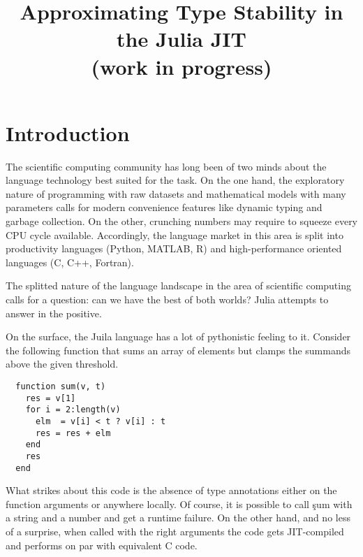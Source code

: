 \documentclass[sigplan,review,anonymous]{acmart}
\begin{document}
\title[Approximating Type Stability in the Julia JIT (work in progress)]{Approximating Type Stability in the Julia JIT\\(work in progress)}


\maketitle

\section{Introduction}

The scientific computing community has long been of two minds about the language
technology best suited for the task. On the one hand, the exploratory nature of
programming with raw datasets and mathematical models with many parameters calls
for modern convenience features like dynamic typing and garbage collection. On
the other, crunching numbers may require to squeeze every CPU cycle available.
Accordingly, the language market in this area is split into productivity
languages (Python, MATLAB, R) and high-performance oriented languages (C,
C++, Fortran).

The splitted nature of the language landscape in the area of scientific
computing calls for a question: can we have the best of both worlds? Julia
attempts to answer in the positive.

On the surface, the Juila language has a lot of pythonistic feeling to it.
Consider the following function that sums an array of elements but clamps the
summands above the given threshold.
%
\begin{verbatim}
  function sum(v, t)
    res = v[1]
    for i = 2:length(v)
      elm  = v[i] < t ? v[i] : t
      res = res + elm
    end
    res
  end
\end{verbatim}
%
What strikes about this code is the absence of type annotations either on the
function arguments or anywhere locally. Of course, it is possible to call
\c{sum} with a string and a number and get a runtime failure. On the other hand,
and no less of a surprise, when called with the right arguments the code gets
JIT-compiled and performs on par with equivalent C code.
\end{document}
